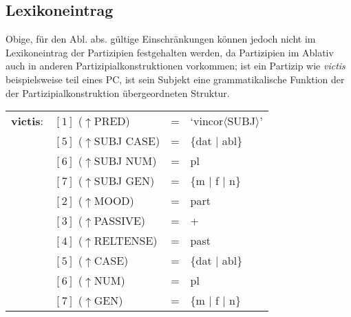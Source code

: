 \documentclass[12pt,a4paper]{article}
\begin{document}
\subsection{Lexikoneintrag}
Obige, für den Abl. abs. gültige Einschränkungen können jedoch nicht im Lexikoneintrag der Partizipien festgehalten werden, da Partizipien im Ablativ auch in anderen Partizipialkonstruktionen vorkommen; ist ein Partizip wie \textit{victis} beispielsweise teil eines PC, ist sein Subjekt eine grammatikalische Funktion der der Partizipialkonstruktion übergeordneten Struktur.
\begin{singlespace}
\begin{tabular}{ l  l  l  l  } 
\textbf{victis}: & $[1]$ \:  ($\uparrow$PRED) & = & `vincor$\langle$SUBJ$\rangle$'\\
$\qquad$ & $[5]$ \: ($\uparrow$SUBJ CASE) & = & \{dat $\mid$ abl\} \\
$\qquad$ & $[6]$ \:  ($\uparrow$SUBJ NUM) & = & pl \\
$\qquad$ & $[7]$ \: ($\uparrow$SUBJ GEN) & = & \{m $\mid$ f $\mid$ n\} \\
$\qquad$ & $[2]$ \:  ($\uparrow$MOOD) & = & part\\
$\qquad$ & $[3]$ \: ($\uparrow$PASSIVE) & = & + \\
$\qquad$ & $[4]$ \: ($\uparrow$RELTENSE) & = & past \\
$\qquad$ & $[5]$ \: ($\uparrow$CASE) & = & \{dat $\mid$ abl\} \\
$\qquad$ & $[6]$ \:  ($\uparrow$NUM) & = & pl \\
$\qquad$ & $[7]$ \: ($\uparrow$GEN) & = & \{m $\mid$ f $\mid$ n\} \\
\end{tabular}
\end{singlespace}
\end{document}

